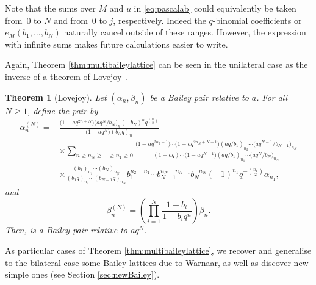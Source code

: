 \documentclass[pdftex]{sigma}
\numberwithin{equation}{section}
\newtheorem{Theorem}{Theorem}[section]
\begin{document}
\begin{Remark}
Note that the sums over $M$ and $u$ in \eqref{eq:pascalab} could equivalently be taken from~$0$ to $N$ and from~$0$ to $j$, respectively. Indeed the $q$-binomial coefficients or $e_M(b_1,\dots ,b_N)$ naturally cancel outside of these ranges. However, the expression with infinite sums makes future calculations easier to write.
\end{Remark}

Again, Theorem \ref{thm:multibaileylattice} can be seen in the unilateral case as the inverse of a theorem of Lovejoy~\cite[Theorem~2.3]{Lo04}.

\begin{Theorem}[Lovejoy]\label{thm:multibaileylatticeLo}
Let $(\alpha_n, \beta_n)$ be a Bailey pair relative to $a$. For all $N\geq 1$, define the pair  by
\begin{align*}
\alpha^{(N)}_n={}&\frac{\bigl(1-aq^{2n+N}\bigr)\bigl(aq^{N}/b_N\bigr)_n(-b_N)^nq^{\binom{n}{2}}}{\bigl(1-aq^N\bigr)(b_Nq)_n}
\\
&\times \sum_{n \geq n_N \geq \cdots \geq n_1 \geq 0} \frac{\bigl(1-aq^{2n_2+1}\bigr) \cdots \bigl(1-aq^{2n_N+N-1}\bigr)(aq/b_1)_{n_2} \cdots \bigl(aq^{N-1}/b_{N-1}\bigr)_{n_N}}{(1-aq) \cdots \bigl(1-aq^{N-1}\bigr)(aq/b_1)_{n_1} \cdots \bigl(aq^{N}/b_{N}\bigr)_{n_N}}
\\
&\times \frac{(b_1)_{n_1} \cdots (b_N)_{n_N}}{(b_1q)_{n_2} \cdots (b_{N-1}q)_{n_N}} b_1^{n_2-n_1} \cdots b_{N-1}^{n_N-n_{N-1}} b_N^{-n_N} (-1)^{n_1} q^{-\binom{n_1}{2}} \alpha_{n_1},
\end{align*}
and
\[
\beta^{(N)}_n=\left(\prod_{i=1}^N \frac{1-b_i}{1-b_iq^n}\right)\beta_n.
\]
Then,  is a Bailey pair relative to $aq^{N}$.
\end{Theorem}


As particular cases of Theorem \ref{thm:multibaileylattice}, we recover and generalise to the bilateral case some Bailey lattices due to Warnaar, as well as discover new simple ones (see Section \ref{sec:newBailey}).
\end{document}
